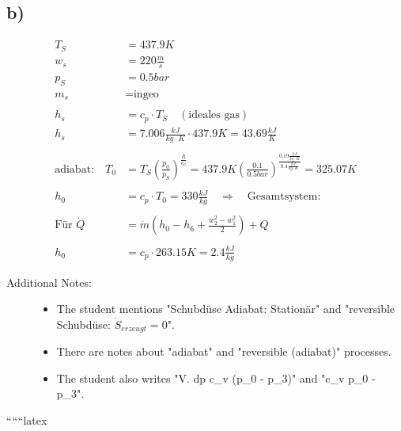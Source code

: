 

\subsection*{b)}

\begin{align*}
    T_S &= 437.9 K \\
    w_s &= 220 \frac{m}{s} \\
    p_S &= 0.5 bar \\
    m_s &= \text{ingeo} \\
    \\
    h_s &= c_p \cdot T_S \quad (\text{ideales gas}) \\
    h_s &= 7.006 \frac{kJ}{kg \cdot K} \cdot 437.9 K = 43.69 \frac{kJ}{K} \\
    \\
    \text{adiabat:} \quad T_0 &= T_S \left( \frac{p_0}{p_S} \right)^{\frac{R}{c_p}} = 437.9 K \left( \frac{0.1}{0.5 bar} \right)^{\frac{0.19 \frac{kJ}{kg \cdot K}}{0.4 \frac{kJ}{kg \cdot K}}} = 325.07 K \\
    \\
    h_0 &= c_p \cdot T_0 = 330 \frac{kJ}{kg} \quad \Rightarrow \quad \text{Gesamtsystem:} \\
    \\
    \text{Für } \dot{Q} &= \dot{m} \left( h_0 - h_6 + \frac{w_2^2 - w_1^2}{2} \right) + Q \\
    \\
    h_0 &= c_p \cdot 263.15 K = 2.4 \frac{kJ}{kg}
\end{align*}

\begin{description}
    \item[Additional Notes:] 
    \begin{itemize}
        \item The student mentions "Schubdüse Adiabat: Stationär" and "reversible Schubdüse: \(\dot{S}_{erzeugt} = 0\)".
        \item There are notes about "adiabat" and "reversible (adiabat)" processes.
        \item The student also writes "V. dp c_v (p_0 - p_3)" and "c_v p_0 - p_3".
    \end{itemize}
\end{description}

``````latex